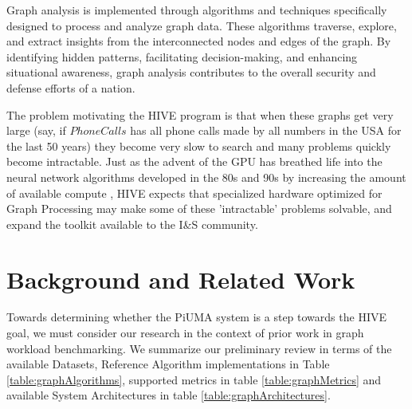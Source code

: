 \documentclass[letterpaper, 10pt]{article}
\begin{document}
\begin{multicols}{2}
        Graph analysis is implemented through algorithms and techniques specifically designed to process and analyze graph data. 
        These algorithms traverse, explore, and extract insights from the interconnected nodes and edges of the graph. By identifying hidden patterns, facilitating decision-making, and enhancing situational awareness, graph analysis contributes to the overall security and defense efforts of a nation. 
        
        The problem motivating the HIVE program is that when these graphs get very large (say, if $PhoneCalls$ has all phone calls made by all numbers in the USA for the last 50 years) they become very slow to search and many problems quickly become intractable.
        Just as the advent of the GPU has breathed life into the neural network algorithms developed in the 80s and 90s by increasing the amount of available compute \cite{Dally2021}, HIVE expects that specialized hardware optimized for Graph Processing may make some of these 'intractable' problems solvable, and expand the toolkit available to the I\&S community. 
        
    \section{Background and Related Work}\label{section:background}
        \par{Towards determining whether the PiUMA system is a step towards the HIVE goal, we must consider our research in the context of prior work in graph workload benchmarking. 
        We summarize our preliminary review in terms of the available Datasets, Reference Algorithm implementations in Table \ref{table:graphAlgorithms}, supported metrics in table \ref{table:graphMetrics} and available System Architectures in table \ref{table:graphArchitectures}.}


\end{multicols}
\end{document}
